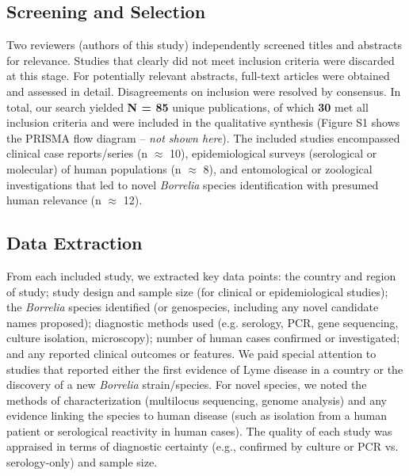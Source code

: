 \documentclass[11pt,letterpaper]{article}
\begin{document}
\subsection{Screening and Selection}
Two reviewers (authors of this study) independently screened titles and abstracts for relevance. Studies that clearly did not meet inclusion criteria were discarded at this stage. For potentially relevant abstracts, full-text articles were obtained and assessed in detail. Disagreements on inclusion were resolved by consensus. In total, our search yielded \textbf{N = 85} unique publications, of which \textbf{30} met all inclusion criteria and were included in the qualitative synthesis (Figure S1 shows the PRISMA flow diagram – \textit{not shown here}). The included studies encompassed clinical case reports/series (n $\approx$ 10), epidemiological surveys (serological or molecular) of human populations (n $\approx$ 8), and entomological or zoological investigations that led to novel \textit{Borrelia} species identification with presumed human relevance (n $\approx$ 12).

\subsection{Data Extraction}
From each included study, we extracted key data points: the country and region of study; study design and sample size (for clinical or epidemiological studies); the \textit{Borrelia} species identified (or genospecies, including any novel candidate names proposed); diagnostic methods used (e.g. serology, PCR, gene sequencing, culture isolation, microscopy); number of human cases confirmed or investigated; and any reported clinical outcomes or features. We paid special attention to studies that reported either the first evidence of Lyme disease in a country or the discovery of a new \textit{Borrelia} strain/species. For novel species, we noted the methods of characterization (multilocus sequencing, genome analysis) and any evidence linking the species to human disease (such as isolation from a human patient or serological reactivity in human cases). The quality of each study was appraised in terms of diagnostic certainty (e.g., confirmed by culture or PCR vs. serology-only) and sample size.
\end{document}
